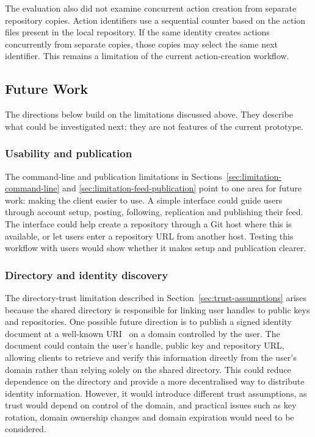 The evaluation also did not examine concurrent action creation from
separate repository copies. Action identifiers use a sequential counter
based on the action files present in the local repository. If the same
identity creates actions concurrently from separate copies, those copies
may select the same next identifier. This remains a limitation of the
current action-creation workflow.

\subsection{Future Work}

The directions below build on the limitations discussed above. They describe
what could be investigated next; they are not features of the current
prototype.

\subsubsection{Usability and publication}

The command-line and publication limitations in
Sections~\ref{sec:limitation-command-line} and
\ref{sec:limitation-feed-publication} point to one area for future work:
making the client easier to use. A simple interface could guide users
through account setup, posting, following, replication and publishing
their feed. The interface could help create a repository through a Git host
where this is available, or let users enter a repository URL from another
host. Testing this workflow with users would show whether it makes setup and
publication clearer. 

\subsubsection{Directory and identity discovery}

The directory-trust limitation described in Section~\ref{sec:trust-assumptions} arises
because the shared directory is responsible for linking user handles to public keys and 
repositories. One possible future direction is to publish a signed identity document at a 
well-known URI~\cite{rfc8615} on a domain controlled by the user. The document could contain 
the user's handle, public key and repository URL, allowing clients to retrieve and verify this 
information directly from the user's domain rather than relying solely on the shared directory. 
This could reduce dependence on the directory and provide a more decentralised way to distribute 
identity information. However, it would introduce different trust assumptions, as trust would 
depend on control of the domain, and practical issues such as key rotation, domain ownership 
changes and domain expiration would need to be considered.

